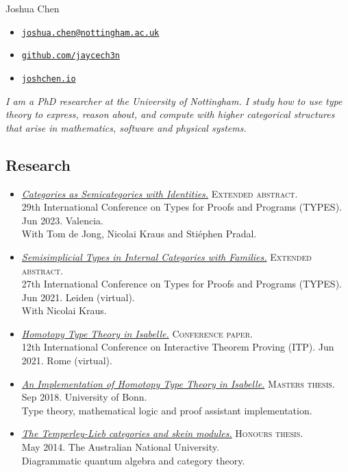 \documentclass[12pt,a4paper]{article}
\author{}
\date{}
\providecommand{\tightlist}{%
  \setlength{\itemsep}{0pt}\setlength{\parskip}{0pt}}
\begin{document}
\thispagestyle{fancy}

{\sc\huge Joshua Chen}
\vspace{1.5ex}
\begin{itemize}
\tightlist
\item[\small\faPaperPlane] \href{mailto:joshua.chen@nottingham.ac.uk}{\nolinkurl{joshua.chen@nottingham.ac.uk}}
\item[\small\faGithub] \href{https://github.com/jaycech3n}{\nolinkurl{github.com/jaycech3n}}
\item[\small\faGlobe] \href{https://joshchen.io}{\nolinkurl{joshchen.io}}
\end{itemize}
\vspace{1.5ex}
\textit{I am a PhD researcher at the University of Nottingham.
I study how to use type theory to express, reason about, and compute with higher categorical structures that arise in mathematics, software and physical systems.}

\subsection{Research}

\begin{itemize}
\item
  \href{https://types2023.webs.upv.es/TYPES2023.pdf}{\emph{Categories as Semicategories with Identities.}}
  \textsc{Extended abstract.}\\
  29th International Conference on Types for Proofs and Programs (TYPES).
  Jun 2023.
  Valencia.\\
  With Tom de Jong, Nicolai Kraus and Stiéphen Pradal.
\item
  \href{https://types21.liacs.nl/download/semisimplicial-types-in-internal-categories-with-families}{\emph{Semisimplicial Types in Internal Categories with Families.}}
  \textsc{Extended abstract.}\\
  27th International Conference on Types for Proofs and Programs (TYPES).
  Jun 2021.
  Leiden (virtual).\\
  With Nicolai Kraus.
\item
  \href{https://doi.org/10.4230/LIPIcs.ITP.2021.12}{\emph{Homotopy Type Theory in Isabelle.}}
  \textsc{Conference paper.}\\
  12th International Conference on Interactive Theorem Proving (ITP).
  Jun 2021.
  Rome (virtual).
\item
  \href{https://arxiv.org/abs/1911.00399}{\emph{An Implementation of Homotopy Type Theory in Isabelle.}}
  \textsc{Masters thesis.}\\
  Sep 2018.
  University of Bonn.\\
  Type theory, mathematical logic and proof assistant implementation.
\item
  \href{https://arxiv.org/abs/1502.06845}{\emph{The Temperley-Lieb categories and skein modules.}}
  \textsc{Honours thesis.}\\
  May 2014.
  The Australian National University.\\
  Diagrammatic quantum algebra and category theory.
\end{itemize}
\end{document}
